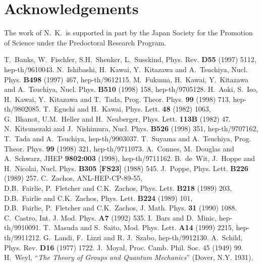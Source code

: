 \documentclass[12pt,a4paper]{article}
\begin{document}
\section*{Acknowledgements}
The work of N.\ K.\ is supported in part by the Japan Society for the
Promotion of Science under the Predoctoral Research Program.

\begin{thebibliography}{99}
 T.~Banks, W.~Fischler, S.H.~Shenker, L.~Susskind,
 Phys. Rev. {\bf D55} (1997) 5112,\\ hep-th/9610043.
 N.~Ishibashi, H.~Kawai, Y.~Kitazawa and A.~Tsuchiya,
 Nucl. Phys. {\bf B498} (1997) 467, hep-th/9612115.
 M.~Fukuma, H.~Kawai, Y.~Kitazawa and A.~Tsuchiya, Nucl. Phys.
 {\bf B510} (1998) 158, hep-th/9705128.
 H.~Aoki, S.~Iso, H.~Kawai, Y.~Kitazawa and T.~Tada,
 Prog. Theor. Phys. {\bf 99} (1998) 713, hep-th/9802085.
 T.~Eguchi and H.~Kawai, Phys. Lett. {\bf 48} (1982) 1063,\\
 G.~Bhanot, U.M.~Heller and H.~Neuberger, Phys. Lett. {\bf 113B}
 (1982) 47.
 N.~Kitsunezaki and J.~Nishimura, Nucl. Phys. {\bf B526} (1998)
 351, hep-th/9707162,\\
 T.~Tada and A.~Tsuchiya, hep-th/9903037.
 T.~Suyama and A.~Tsuchiya, Prog. Theor. Phys. {\bf 99}
 (1998) 321, hep-th/9711073.
 A.~Connes, M.~Douglas and A.~Schwarz, JHEP {\bf 9802:003} (1998),
 hep-th/9711162.
 B.~de~Wit, J.~Hoppe and H.~Nicolai, Nucl. Phys. {\bf B305 [FS23]}
 (1988) 545.
 J.~Poppe, Phys. Lett. {\bf B226} (1989) 257.
 C.~Zachos, ANL-HEP-CP-89-55,\\
 D.B.~Fairlie, P.~Fletcher and C.K.~Zachos, Phys. Lett.
 {\bf B218} (1989) 203,\\
 D.B.~Fairlie and C.K.~Zachos, Phys. Lett. {\bf B224} (1989) 101,\\
 D.B.~Fairlie, P.~Fletcher and C.K.~Zachos, J. Math. Phys.
{\bf 31} (1990) 1088.
 C.~Castro, Int. J. Mod. Phys. {\bf A7} (1992) 535.
 I.~Bars and D.~Minic, hep-th/9910091.
 T.~Masuda and S.~Saito, Mod. Phys. Lett. {\bf A14} (1999) 2215,
 hep-th/9911212.
 G.~Landi, F.~Lizzi and R. J.~Szabo, hep-th/9912130.
 A.~Schild, Phys. Rev. {\bf D16} (1977) 1722.
 J.~Moyal, Proc. Camb. Phil. Soc. {\rm 45} (1949) 99.
 H.~Weyl, ``{\it The Theory of Groups and Quantum Mechanics}''
 (Dover, N.Y. 1931).

\end{thebibliography}
\end{document}

